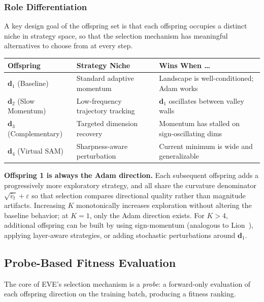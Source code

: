 \documentclass[12pt]{article}
\newcommand{\notebox}[1]{%
  \begin{tcolorbox}[notestyle]
    #1
  \end{tcolorbox}
}
\begin{document}
\subsubsection{Role Differentiation}

A key design goal of the offspring set is that each offspring
occupies a distinct niche in strategy space, so that the selection
mechanism has meaningful alternatives to choose from at every step.

\begin{center}
\small
\begin{tabular}{@{}lll@{}}
  \toprule
  Offspring & Strategy Niche & Wins When \ldots \\
  \midrule
  $\mathbf{d}_1$ (Baseline)
    & Standard adaptive momentum
    & Landscape is well-conditioned; Adam works \\
  $\mathbf{d}_2$ (Slow Momentum)
    & Low-frequency trajectory tracking
    & $\mathbf{d}_1$ oscillates between valley walls \\
  $\mathbf{d}_3$ (Complementary)
    & Targeted dimension recovery
    & Momentum has stalled on sign-oscillating dims \\
  $\mathbf{d}_4$ (Virtual SAM)
    & Sharpness-aware perturbation
    & Current minimum is wide and generalizable \\
  \bottomrule
\end{tabular}
\end{center}

\notebox{%
\textbf{Offspring 1 is always the Adam direction.}
Each subsequent offspring adds a progressively more exploratory strategy,
and all share the curvature denominator $\sqrt{\hat{v}_t} + \varepsilon$
so that selection compares directional quality rather than magnitude
artifacts.
Increasing $K$ monotonically increases exploration without altering the
baseline behavior; at $K = 1$, only the Adam direction exists.
For $K > 4$, additional offspring can be built by using sign-momentum
(analogous to Lion~\cite{chen2024lion}), applying layer-aware strategies,
or adding stochastic perturbations around $\mathbf{d}_1$.
}


\subsection{Probe-Based Fitness Evaluation}
\label{ssec:probe}

The core of EVE's selection mechanism is a \emph{probe}: a forward-only
evaluation of each offspring direction on the training batch, producing
a fitness ranking.
\end{document}
